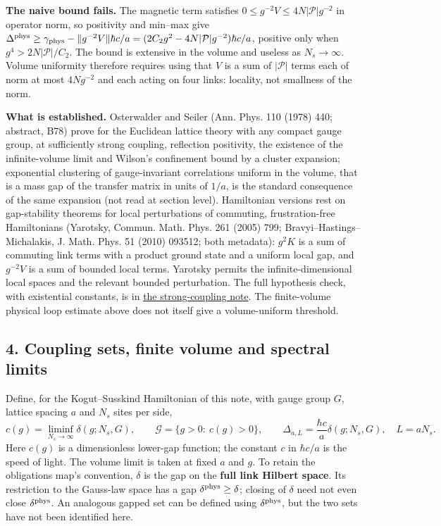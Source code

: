 \documentclass[11pt,a4paper]{article}
\begin{document}
\textbf{The naive bound fails.} The magnetic term satisfies
\(0\le g^{-2}V\le4N|\mathcal P|g^{-2}\) in operator norm, so positivity
and min--max give
\(\Delta^{\rm phys}\ge\gamma_{\rm phys}-\|g^{-2}V\|\hbar c/a
=(2C_2g^2-4N|\mathcal P|g^{-2})\hbar c/a\), positive only when
\(g^4>2N|\mathcal P|/C_2\). The bound is extensive in the volume and
useless as \(N_s\to\infty\). Volume uniformity therefore requires using
that \(V\) is a sum of \(|\mathcal P|\) terms each of norm at most
\(4N g^{-2}\) and each acting on four links: locality, not smallness of
the norm.

\textbf{What is established.} Osterwalder and Seiler (Ann. Phys. 110
(1978) 440; abstract, B78) prove for the Euclidean lattice theory with
any compact gauge group, at sufficiently strong coupling, reflection
positivity, the existence of the infinite-volume limit and Wilson's
confinement bound by a cluster expansion; exponential clustering of
gauge-invariant correlations uniform in the volume, that is a mass gap
of the transfer matrix in units of \(1/a\), is the standard consequence
of the same expansion (not read at section level). Hamiltonian versions
rest on gap-stability theorems for local perturbations of commuting,
frustration-free Hamiltonians (Yarotsky, Commun. Math. Phys. 261 (2005)
799; Bravyi--Hastings--Michalakis, J. Math. Phys. 51 (2010) 093512; both
metadata): \(g^2K\) is a sum of commuting link terms with a product
ground state and a uniform local gap, and \(g^{-2}V\) is a sum of
bounded local terms. Yarotsky permits the infinite-dimensional local
spaces and the relevant bounded perturbation. The full hypothesis check,
with existential constants, is in
\href{strong-coupling-uniform-gap.md}{the strong-coupling note}. The
finite-volume physical loop estimate above does not itself give a
volume-uniform threshold.

\subsection{4. Coupling sets, finite volume and spectral
limits}\label{coupling-sets-finite-volume-and-spectral-limits}

Define, for the Kogut--Susskind Hamiltonian of this note, with gauge
group \(G\), lattice spacing \(a\) and \(N_s\) sites per side,
\[c(g)=\liminf_{N_s\to\infty}\delta(g;N_s,G),\qquad
\mathcal G=\{g>0:\ c(g)>0\},\qquad
\Delta_{a,L}=\frac{\hbar c}{a}\delta(g;N_s,G),\quad L=aN_s.\] Here
\(c(g)\) is a dimensionless lower-gap function; the constant \(c\) in
\(\hbar c/a\) is the speed of light. The volume limit is taken at fixed
\(a\) and \(g\). To retain the obligations map's convention, \(\delta\)
is the gap on the \textbf{full link Hilbert space}. Its restriction to
the Gauss-law space has a gap \(\delta^{\rm phys}\ge\delta\); closing of
\(\delta\) need not even close \(\delta^{\rm phys}\). An analogous
gapped set can be defined using \(\delta^{\rm phys}\), but the two sets
have not been identified here.
\end{document}
